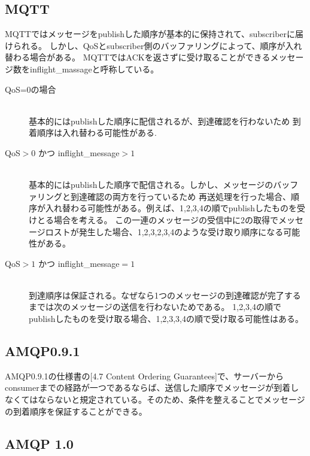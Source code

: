 \documentclass[uplatex, twocolumn,10pt]{jsarticle}
\begin{document}
\subsection{MQTT}

MQTTではメッセージをpublishした順序が基本的に保持されて、subscriberに届けられる。
しかし、QoSとsubscriber側のバッファリングによって、順序が入れ替わる場合がある。
MQTTではACKを返さずに受け取ることができるメッセージ数をinflight\_massageと呼称している。

\begin{description}
    \item[QoS=0の場合]\mbox{}\\
    基本的にはpublishした順序に配信されるが、到達確認を行わないため
    到着順序は入れ替わる可能性がある.\\
    
    \item[QoS$>0$ かつ inflight\_message$>1$]\mbox{}\\
    基本的にはpublishした順序で配信される。しかし、メッセージのバッファリングと到達確認の両方を行っているため
    再送処理を行った場合、順序が入れ替わる可能性がある。例えば、1,2,3,4の順でpublishしたものを受けとる場合を考える。
    この一連のメッセージの受信中に2の取得でメッセージロストが発生した場合、1,2,3,2,3,4のような受け取り順序になる可能性がある。\\

    \item[QoS$>1$ かつ inflight\_message$=1$]\mbox{}\\
    到達順序は保証される。なぜなら1つのメッセージの到達確認が完了するまでは次のメッセージの送信を行わないためである。
    1,2,3,4の順でpublishしたものを受け取る場合、1,2,3,3,4の順で受け取る可能性はある。
    
\end{description}

\subsection{AMQP0.9.1}

AMQP0.9.1の仕様書\cite{AMQPWork14:online}の[4.7 Content Ordering Guarantees]で、サーバーからconsumerまでの経路が一つであるならば、送信した順序でメッセージが到着しなくてはならないと規定されている。そのため、条件を整えることでメッセージの到着順序を保証することができる。

\subsection{AMQP 1.0}
\end{document}
